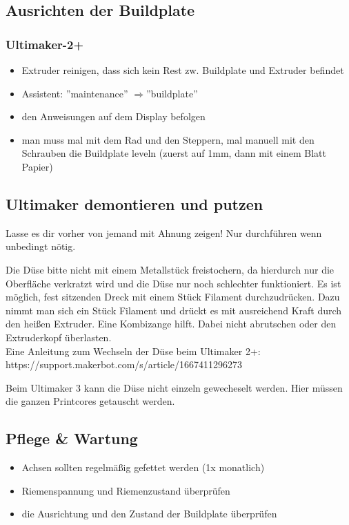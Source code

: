 \documentclass{\basedir/fablab-document}
\newcommand{\ra}{$\Rightarrow$}
\begin{document}
\subsection{Ausrichten der Buildplate}

\subsubsection{Ultimaker-2+}
\begin{itemize}
\item Extruder reinigen, dass sich kein Rest zw. Buildplate und Extruder befindet
\item Assistent: ''maintenance'' \ra ''buildplate''
\item den Anweisungen auf dem Display befolgen
\item man muss mal mit dem Rad und den Steppern, mal manuell mit den Schrauben die Buildplate leveln (zuerst auf 1mm, dann mit einem Blatt Papier)
\end{itemize}


\subsection{Ultimaker demontieren und putzen}
Lasse es dir vorher von jemand mit Ahnung zeigen! Nur durchführen wenn unbedingt nötig.

Die Düse bitte nicht mit einem Metallstück freistochern, da hierdurch nur die Oberfläche verkratzt wird und die Düse nur noch schlechter funktioniert. Es ist möglich, fest sitzenden Dreck mit einem Stück Filament durchzudrücken. Dazu nimmt man sich ein Stück Filament und drückt es mit ausreichend Kraft durch den heißen Extruder. Eine Kombizange hilft. Dabei nicht abrutschen oder den Extruderkopf überlasten.
\\

Eine Anleitung zum Wechseln der Düse beim Ultimaker 2+: 
 \\ https://support.makerbot.com/s/article/1667411296273 \hspace{2cm}

\vspace{1cm}

Beim Ultimaker 3 kann die Düse nicht einzeln gewecheselt werden. Hier müssen die ganzen Printcores getauscht werden.

\subsection{Pflege \& Wartung}

\begin{itemize}
\item Achsen sollten regelmäßig gefettet werden (1x monatlich)
\item Riemenspannung und Riemenzustand überprüfen
\item die Ausrichtung und den Zustand der Buildplate überprüfen
\end{itemize}

\end{document}

